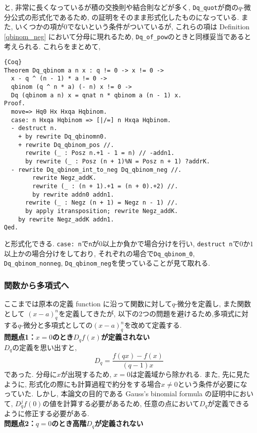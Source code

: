 \documentclass[11pt]{jarticle}
\theoremstyle{mystyle}
\newtheorem{rmk}[df]{$\textrm{Remark}$}
\newcommand{\brmk}{\begin{rmk}}
\newcommand{\ermk}{\end{rmk}}
\newcommand{\0}{\textbf{0}}
\newcommand{\1}{\textbf{1}}
\newcommand{\2}{\textbf{2}}
\begin{document}
と, 非常に長くなっているが積の交換則や結合則などが多く, {\tt Dq\_quot}が商の$q$-微分公式の形式化であるため, \cite{Kac}の証明をそのまま形式化したものになっている.  また, いくつかの項が$0$でないという条件がついているが, これらの項は Definition \ref{qbinom_neg} において分母に現れるため, {\tt Dq\_of\_pow}のときと同様妥当であると考えられる. これらをまとめて, 
\begin{lstlisting}{Coq}
Theorem Dq_qbinom a n x : q != 0 -> x != 0 ->
  x - q ^ (n - 1) * a != 0 ->
  qbinom (q ^ n * a) (- n) x != 0 ->
  Dq (qbinom a n) x = qnat n * qbinom a (n - 1) x.
Proof.
  move=> Hq0 Hx Hxqa Hqbinom.
  case: n Hxqa Hqbinom => [|/=] n Hxqa Hqbinom.
  - destruct n.
    + by rewrite Dq_qbinomn0.
    + rewrite Dq_qbinom_pos //.
      rewrite (_ : Posz n.+1 - 1 = n) // -addn1.
      by rewrite (_ : Posz (n + 1)%N = Posz n + 1) ?addrK.
  - rewrite Dq_qbinom_int_to_neg Dq_qbinom_neg //.
        rewrite Negz_addK.
        rewrite (_ : (n + 1).+1 = (n + 0).+2) //.
        by rewrite addn0 addn1.
      rewrite (_ : Negz (n + 1) = Negz n - 1) //.
      by apply itransposition; rewrite Negz_addK.
    by rewrite Negz_addK addn1.
Qed.
\end{lstlisting}
と形式化できる. {\tt case:\,n}で{\tt n}が$0$以上か負かで場合分けを行い, {\tt destruct n}で$0$か$1$以上かの場合分けをしており, それぞれの場合で{\tt Dq\_qbinom\_0}, {\tt Dq\_qbinom\_nonneg}, {\tt Dq\_qbinom\_neg}を使っていることが見て取れる. 
\subsubsection{関数から多項式へ} \label{sssec poly}
ここまでは原本の定義 function に沿って関数に対して$q$-微分を定義し, また関数として
$(x - a)^n_q$を定義してきたが, 以下の2つの問題を避けるため,多項式に対する$q$-微分と多項式としての$(x - a)^n_q$を改めて定義する. \\
\textbf{問題点1：$x = 0$のとき$D_q f(x)$が定義されない}\\
$D_q$の定義を思い出すと, 
\[
  D_q = \frac{f(qx) - f(x)}{(q - 1)x}
\]
であった. 分母に$x$が出現するため, $x = 0$は定義域から除かれる. また, 先に見たように, 形式化の際にも計算過程で約分をする場合$x \neq 0$という条件が必要になっていた. しかし, 本論文の目的である Gauss's binomial formula の証明中において, $D_q^j f (0)$の値を計算する必要があるため, 任意の点において$D_q$が定義できるように修正する必要がある. \\
\textbf{問題点2：$q = 0$のとき高階$D_q$が定義されない}\\
\end{document}
